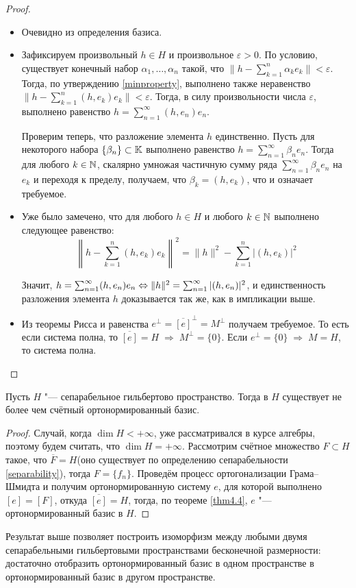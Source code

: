 \begin{proof}~
	\begin{itemize}
		\item{}Очевидно из определения базиса.
  
		\item{}Зафиксируем произвольный $h \in H$ и произвольное $\varepsilon > 0$. По условию, существует конечный набор $\alpha_1, \dotsc, \alpha_n$ такой, что $\|h - \sum_{k = 1}^n\alpha_k e_k\| < \varepsilon$. Тогда, по утверждению \ref{minproperty}, выполнено также неравенство $\|h - \sum_{k = 1}^n(h, e_k) e_k\| < \varepsilon$. Тогда, в силу произвольности числа $\varepsilon$, выполнено равенство $h = \sum_{n = 1}^\infty (h, e_n)e_n$.
		
		Проверим теперь, что разложение элемента $h$ единственно. Пусть для некоторого набора $\{\beta_n\} \subset \mathbb{K}$ выполнено равенство $h = \sum_{n = 1}^\infty \beta_n e_n$. Тогда для любого $k \in \mathbb{N}$, скалярно умножая частичную сумму ряда $\sum_{n = 1}^\infty\beta_n e_n$ на $e_k$ и переходя к пределу, получаем, что $\beta_k = (h, e_k)$, что и означает требуемое.
  
		\item{}Уже было замечено, что для любого $h \in H$ и любого $k \in \mathbb{N}$ выполнено следующее равенство:
		\[\left\|h - \sum_{k = 1}^n(h, e_k)e_k\right\|^2 = \|h\|^2 - \sum_{k = 1}^n|(h, e_k)|^2\]
		
		Значит, $h = \sum_{n = 1}^\infty (h, e_n)e_n \Leftrightarrow \|h\|^2 = \sum_{n = 1}^\infty |(h, e_n)|^2$, и единственность разложения элемента $h$ доказывается так же, как в импликации выше.
  
		\item{}Из теоремы Рисса  и равенства $e^{\perp} = \overline{[e]}^{\perp} = M^{\perp}$ получаем требуемое. То есть \\ если система полна, то $\overline{[e]} = H \; \Rightarrow \; M^{\perp} = \{0\}$. Если $e^\perp = \{0\} \; \Rightarrow \; M = H $, то система полна. \qedhere
	\end{itemize}
\end{proof}

\begin{corollary}
	Пусть $H$ "--- сепарабельное гильбертово пространство. Тогда в $H$ существует не более чем счётный ортонормированный базис.
\end{corollary}

\begin{proof}
	Случай, когда $\dim H <+\infty$, уже рассматривался в курсе алгебры, поэтому будем считать, что $\dim H = +\infty$. Рассмотрим счётное множество $F \subset H$ такое, что $\overline F = H$(оно существует по определению сепарабельности \ref{separability}), тогда $F = \{f_n\}$. Проведём процесс ортогонализации Грама--Шмидта и получим ортонормированную систему $e$, для которой выполнено $[e] = [F]$, откуда $\overline{[e]} = H$, тогда, по теореме \ref{thm4.4}, $e$ "--- ортонормированный базис в $H$.  
\end{proof}

\begin{note}
	Результат выше позволяет построить изоморфизм между любыми двумя сепарабельными гильбертовыми пространствами бесконечной размерности: достаточно отобразить ортонормированный базис в одном пространстве в ортонормированный базис в другом пространстве.
\end{note}
